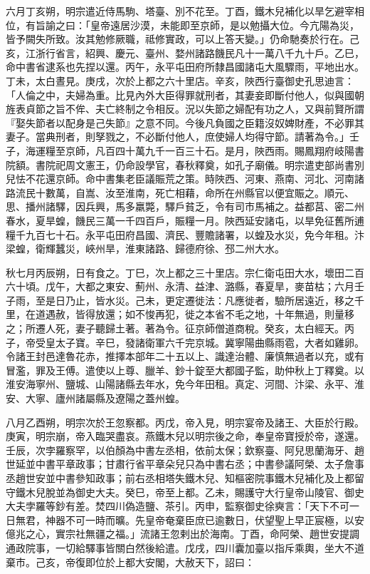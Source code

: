 \begin{pinyinscope}
 六月丁亥朔，明宗遣近侍馬駒、塔臺、別不花至。丁酉，鐵木兒補化以旱乞避宰相位，有旨諭之曰：「皇帝遠居沙漠，未能即至京師，是以勉攝大位。今亢陽為災，皆予闕失所致。汝其勉修厥職，祗修實政，可以上答天變。」仍命馳奏於行在。己亥，江浙行省言，紹興、慶元、臺州、婺州諸路饑民凡十一萬八千九十戶。乙巳，命中書省逮系也先捏以還。丙午，永平屯田府所隸昌國諸屯大風驟雨，平地出水。丁未，太白晝見。庚戌，次於上都之六十里店。辛亥，陜西行臺御史孔思迪言：「人倫之中，夫婦為重。比見內外大臣得罪就刑者，其妻妾即斷付他人，似與國朝旌表貞節之旨不侔、夫亡終制之令相反。況以失節之婦配有功之人，又與前賢所謂『娶失節者以配身是己失節』之意不同。今後凡負國之臣籍沒奴婢財產，不必罪其妻子。當典刑者，則孥戮之，不必斷付他人，庶使婦人均得守節。請著為令。」壬子，海運糧至京師，凡百四十萬九千一百三十石。是月，陜西雨。賜鳳翔府岐陽書院額。書院祀周文憲王，仍命設學官，春秋釋奠，如孔子廟儀。明宗遣吏部尚書別兒怯不花還京師。命中書集老臣議賑荒之策。時陜西、河東、燕南、河北、河南諸路流民十數萬，自嵩、汝至淮南，死亡相藉，命所在州縣官以便宜賑之。順元、思、播州諸驛，因兵興，馬多羸斃，驛戶貧乏，令有司市馬補之。益都莒、密二州春水，夏旱蝗，饑民三萬一千四百戶，賑糧一月。陜西延安諸屯，以旱免征舊所逋糧千九百七十石。永平屯田府昌國、濟民、豐贍諸署，以蝗及水災，免今年租。汴梁蝗，衛輝蠶災，峽州旱，淮東諸路、歸德府徐、邳二州大水。



 秋七月丙辰朔，日有食之。丁巳，次上都之三十里店。宗仁衛屯田大水，壞田二百六十頃。戊午，大都之東安、薊州、永清、益津、潞縣，春夏旱，麥苗枯；六月壬子雨，至是日乃止，皆水災。己未，更定遷徙法：凡應徙者，驗所居遠近，移之千里，在道遇赦，皆得放還；如不悛再犯，徙之本省不毛之地，十年無過，則量移之；所遷人死，妻子聽歸土著。著為令。征京師僧道商稅。癸亥，太白經天。丙子，帝受皇太子寶。辛巳，發諸衛軍六千完京城。冀寧陽曲縣雨雹，大者如雞卵。令諸王封邑達魯花赤，推擇本部年二十五以上、識達治體、廉慎無過者以充，或有冒濫，罪及王傅。遣使以上尊、臘羊、鈔十錠至大都國子監，助仲秋上丁釋奠。以淮安海寧州、鹽城、山陽諸縣去年水，免今年田租。真定、河間、汴梁、永平、淮安、大寧、廬州諸屬縣及遼陽之蓋州蝗。



 八月乙酉朔，明宗次於王忽察都。丙戊，帝入見，明宗宴帝及諸王、大臣於行殿。庚寅，明宗崩，帝入臨哭盡哀。燕鐵木兒以明宗後之命，奉皇帝寶授於帝，遂還。壬辰，次孛羅察罕，以伯顏為中書左丞相，依前太保；欽察臺、阿兒思蘭海牙、趙世延並中書平章政事；甘肅行省平章朵兒只為中書右丞；中書參議阿榮、太子詹事丞趙世安並中書參知政事；前右丞相塔失鐵木兒、知樞密院事鐵木兒補化及上都留守鐵木兒脫並為御史大夫。癸巳，帝至上都。乙未，賜護守大行皇帝山陵官、御史大夫孛羅等鈔有差。焚四川偽造鹽、茶引。丙申，監察御史徐奭言：「天下不可一日無君，神器不可一時而曠。先皇帝奄棄臣庶已逾數日，伏望聖上早正宸極，以安億兆之心，實宗社無疆之福。」流諸王忽剌出於海南。丁酉，命阿榮、趙世安提調通政院事，一切給驛事皆關白然後給遣。戊戌，四川囊加臺以指斥乘輿，坐大不道棄市。己亥，帝復即位於上都大安閣，大赦天下，詔曰：




\end{pinyinscope}
